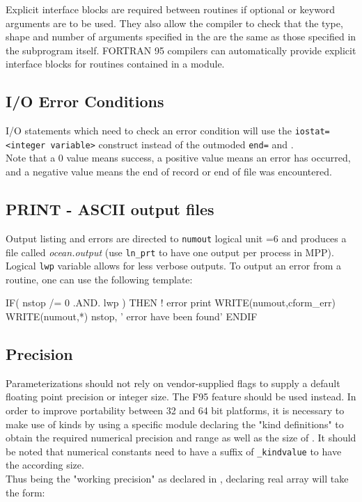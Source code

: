 \documentclass{article}
\begin{document}
Explicit interface blocks are required between routines if optional or keyword arguments are to be used.
They also allow the compiler to check that the type, shape and number of arguments specified in the 
are the same as those specified in the subprogram itself.
FORTRAN 95 compilers can automatically provide explicit interface blocks for routines contained in a module.

\subsection{I/O Error Conditions}

I/O statements which need to check an error condition will use the \texttt{iostat=<integer variable>} construct
instead of the outmoded \texttt{end=} and . \\
Note that a 0 value means success, a positive value means an error has occurred, and
a negative value means the end of record or end of file was encountered.

\subsection{PRINT - ASCII output files}

Output listing and errors are directed to \texttt{numout} logical unit =6 and
produces a file called \textit{ocean.output} (use \texttt{ln\_prt} to have one output per process in MPP).
Logical \texttt{lwp} variable allows for less verbose outputs.
To output an error from a routine, one can use the following template:

\begin{forlines}
IF( nstop /= 0 .AND. lwp ) THEN   ! error print
   WRITE(numout,cform_err)
   WRITE(numout,*) nstop, ' error have been found'
ENDIF
\end{forlines}

\subsection{Precision}

Parameterizations should not rely on vendor-supplied flags to supply a default floating point precision or
integer size.
The F95  feature should be used instead.
In order to improve portability between 32 and 64 bit platforms,
it is necessary to make use of kinds by using a specific module 
declaring the "kind definitions" to obtain the required numerical precision and range as well as
the size of .
It should be noted that numerical constants need to have a suffix of \texttt{\_kindvalue} to
have the according size. \\
Thus  being the "working precision" as declared in ,
declaring real array  will take the form:
\end{document}
